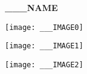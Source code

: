 %
%
%
%

\begin{center} 
  \vspace*{\fill}
  \Huge{\textbf{___NAME}}
  \vspace*{\fill}
\end{center}
\newpage


\begin{center}
\texttt{[image: \_\_\_IMAGE0]} %
\newpage

\texttt{[image: \_\_\_IMAGE1]} %
\newpage

\texttt{[image: \_\_\_IMAGE2]} %


\end{center}

\newpage

\chead{}



